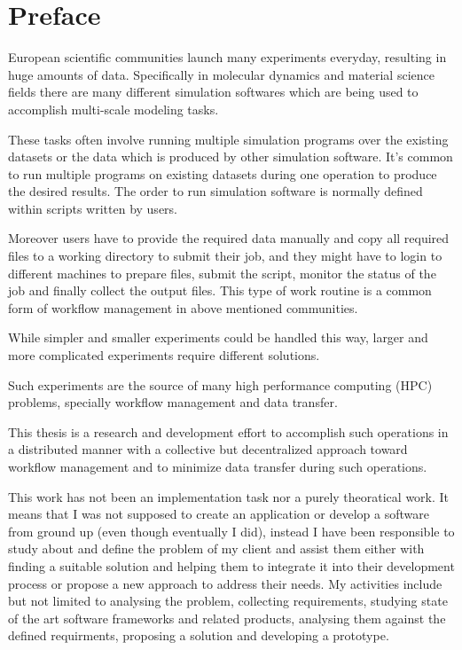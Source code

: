 \chapter*{Preface}
\label{cha:preface}

European scientific communities launch many experiments everyday, resulting in huge amounts
of data. Specifically in molecular dynamics and material science fields there are many different
simulation softwares which are being used to accomplish multi-scale modeling tasks. 

These tasks
often involve running multiple simulation programs over the existing datasets or the data which is
produced by other simulation software. It's common to run multiple programs on existing datasets
during one operation to produce the desired results. The order to run simulation software is normally 
defined within scripts written by users. 

Moreover users have to provide the required data manually and copy all required files to a working
directory to submit their job, and they might have to login to different machines to prepare files,
submit the script, monitor the status of the job and finally collect the output files. 
This type of work routine is a common form of workflow management in above mentioned communities.

While simpler and smaller experiments could be handled this way, larger and more complicated experiments
require different solutions. 

Such experiments are the source of many high performance computing (HPC) problems, specially workflow management and data transfer.


This thesis is a research and development effort to accomplish such operations in a distributed manner with a 
collective but decentralized approach toward workflow management and to minimize data transfer during such operations.

This work has not been an implementation task nor a purely theoratical work. 
It means that I was not supposed to create an application or develop a software from ground up (even though eventually I did), instead
I have been responsible to study about and define the problem of my client and assist them either with 
finding a suitable solution and helping them to integrate it into their development process or propose a new approach to address their 
needs. My activities include but not limited to analysing the problem, collecting requirements,
studying state of the art software frameworks and related products,
analysing them against the defined requirments, proposing a solution and developing a prototype.

